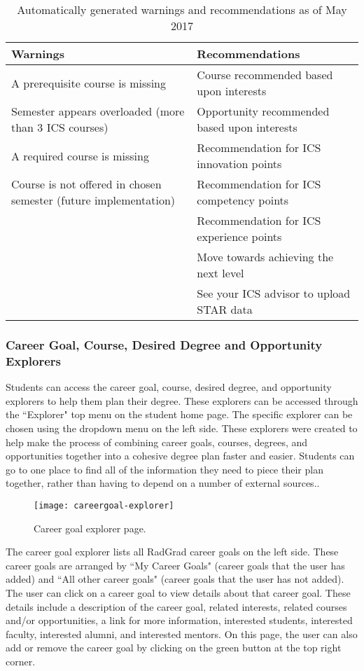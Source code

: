 \begin{table}[htbp!]
\centering
\begin{tabular}{  |p{8cm}|p{8cm}| } 
  \hline
 \textbf{Warnings} & \textbf{Recommendations} \\ 
  \hline
A prerequisite course is missing & Course recommended based upon interests\\
\hline
Semester appears overloaded (more than 3 ICS courses) & Opportunity recommended based upon interests\\
\hline
A required course is missing & Recommendation for ICS innovation points \\
\hline
Course is not offered in chosen semester (future implementation) & Recommendation for ICS competency points \\
\hline
& Recommendation for ICS experience points\\
\hline
& Move towards achieving the next level \\
\hline
& See your ICS advisor to upload STAR data\\
 \hline
\end{tabular}
\caption{Automatically generated warnings and recommendations as of May 2017}
\label{table:4}
\end{table}

\subsubsection{Career Goal, Course, Desired Degree and Opportunity Explorers}
Students can access the career goal, course, desired degree, and opportunity explorers to help them plan their degree.  These explorers can be accessed through the ``Explorer" top menu on the student home page. The specific explorer can be chosen using the dropdown menu on the left side. These explorers were created to help make the process of combining career goals, courses, degrees, and opportunities together into a cohesive degree plan faster and easier. Students can go to one place to find all of the information they need to piece their plan together, rather than having to depend on a number of external sources..

\begin{figure}[htbp!]
\centering
\texttt{[image: careergoal-explorer]}
\caption{Career goal explorer page.}
\end{figure}

The career goal explorer lists all RadGrad career goals on the left side. These career goals are arranged by ``My Career Goals" (career goals that the user has added) and ``All other career goals" (career goals that the user has not added). The user can click on a career goal to view details about that career goal. These details include a description of the career goal, related interests, related courses and/or opportunities, a link for more information, interested students, interested faculty, interested alumni, and interested mentors. On this page, the user can also add or remove the career goal by clicking on the green button at the top right corner.  

